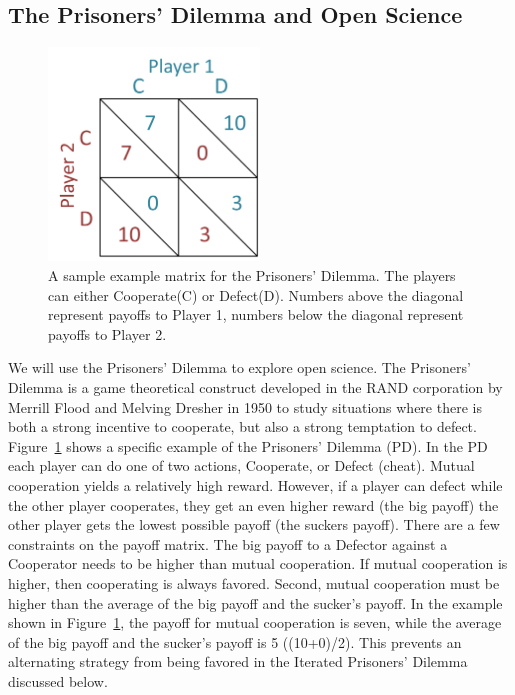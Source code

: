 \documentclass[11pt]{article} %
\begin{document}
\subsection{The Prisoners' Dilemma and Open Science}
\begin{figure}[ht]
	\includegraphics[width=0.5\textwidth]{files/figures/pdmatrix.png}
	\caption{A sample example matrix for the Prisoners' Dilemma. The players can either Cooperate(C) or Defect(D).  Numbers above the diagonal represent payoffs to Player 1, numbers below the diagonal represent payoffs to Player 2.}
	\label{pdmatrix}
\end{figure}
We will use the Prisoners' Dilemma to explore open science. The Prisoners' Dilemma is a game theoretical construct developed in the RAND corporation by Merrill Flood and Melving Dresher in 1950 \cite{ABAGFBEC19920101, unm.b196052419570101} to study situations where there is both a strong incentive to cooperate, but also a strong temptation to defect. Figure~\ref{pdmatrix} shows a specific example of the Prisoners' Dilemma (PD). In the PD each player can do one of two actions, Cooperate, or Defect (cheat). Mutual cooperation yields a relatively high reward. However, if a player can defect while the other player cooperates, they get an even higher reward (the big payoff) the other player gets the lowest possible payoff (the suckers payoff). There are a few constraints on the payoff matrix. The big payoff to a Defector against a Cooperator needs to be higher than mutual cooperation. If mutual cooperation is higher, then cooperating is always favored. Second, mutual cooperation must be higher than the average of the big payoff and the sucker's payoff. In the example shown in Figure~\ref{pdmatrix}, the payoff for mutual cooperation is seven, while the average of the big payoff and the sucker's payoff is 5 ((10+0)/2). This prevents an alternating strategy from being favored in the Iterated Prisoners' Dilemma discussed below.
\end{document}
